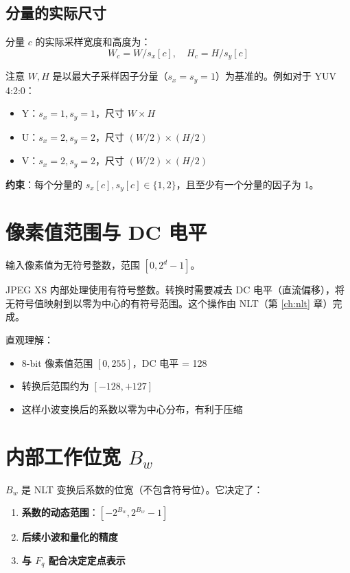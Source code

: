 \subsection{分量的实际尺寸}

分量 $c$ 的实际采样宽度和高度为：
\begin{equation}
W_c = W / s_x[c], \quad H_c = H / s_y[c]
\end{equation}

注意 $W, H$ 是以最大子采样因子分量（$s_x = s_y = 1$）为基准的。例如对于 YUV 4:2:0：
\begin{itemize}
  \item Y：$s_x = 1, s_y = 1$，尺寸 $W \times H$
  \item U：$s_x = 2, s_y = 2$，尺寸 $(W/2) \times (H/2)$
  \item V：$s_x = 2, s_y = 2$，尺寸 $(W/2) \times (H/2)$
\end{itemize}

\textbf{约束}：每个分量的 $s_x[c], s_y[c] \in \{1, 2\}$，且至少有一个分量的因子为 1。

\section{像素值范围与 DC 电平}

输入像素值为无符号整数，范围 $[0, 2^d - 1]$。

JPEG XS 内部处理使用有符号整数。转换时需要减去 DC 电平（直流偏移），将无符号值映射到以零为中心的有符号范围。这个操作由 NLT（第 \ref{ch:nlt} 章）完成。

直观理解：
\begin{itemize}
  \item 8-bit 像素值范围 $[0, 255]$，DC 电平 = 128
  \item 转换后范围约为 $[-128, +127]$
  \item 这样小波变换后的系数以零为中心分布，有利于压缩
\end{itemize}

\section{内部工作位宽 $B_w$}

$B_w$ 是 NLT 变换后系数的位宽（不包含符号位）。它决定了：
\begin{enumerate}
  \item \textbf{系数的动态范围}：$[-2^{B_w}, 2^{B_w} - 1]$
  \item \textbf{后续小波和量化的精度}
  \item \textbf{与 $F_q$ 配合决定定点表示}
\end{enumerate}

